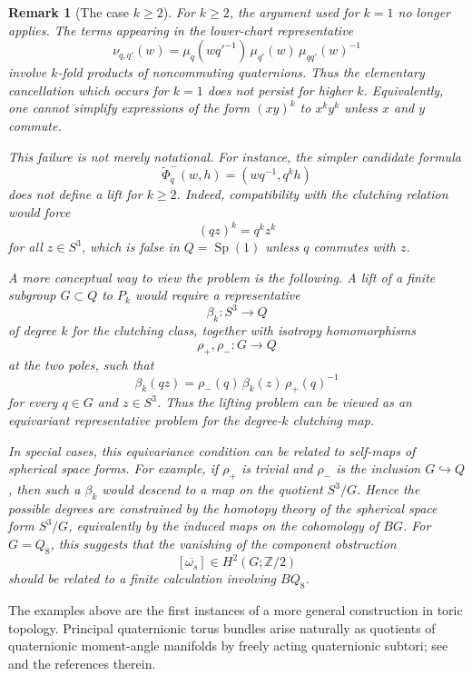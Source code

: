 \documentclass[11pt,a4paper]{article}
\numberwithin{equation}{section}
\newtheorem{remark}[definition]{Remark}
\theoremstyle{named}
\begin{document}
\begin{remark}[The case \(k\geq 2\)]
\label{rem:clutching-k2}
For \(k\geq 2\), the argument used for \(k=1\) no longer applies. The terms appearing in the lower-chart representative
\[
\nu_{q,q'}(w) =\mu_q(wq'^{-1})\,\mu_{q'}(w)\,\mu_{qq'}(w)^{-1}
\]
involve \(k\)-fold products of noncommuting quaternions. Thus the elementary cancellation which occurs for \(k=1\) does not persist for higher \(k\). Equivalently, one cannot simplify expressions of the form \((xy)^k\) to \(x^ky^k\) unless \(x\) and \(y\) commute.

This failure is not merely notational. For instance, the simpler candidate formula
\[
\widetilde\Phi_q^-(w,h)=(wq^{-1},q^k h)
\]
does not define a lift for \(k\geq 2\). Indeed, compatibility with the clutching relation would force
\[
(qz)^k=q^kz^k
\]
for all \(z\in S^3\), which is false in \(Q=\operatorname{Sp}(1)\) unless \(q\) commutes with \(z\).

A more conceptual way to view the problem is the following. A lift of a finite subgroup \(G\subset Q\) to \(P_k\) would require a representative
\[
\beta_k:S^3\longrightarrow Q
\]
of degree \(k\) for the clutching class, together with isotropy homomorphisms
\[
\rho_+,\rho_-:G\longrightarrow Q
\]
at the two poles, such that
\[
\beta_k(qz)=\rho_-(q)\,\beta_k(z)\,\rho_+(q)^{-1}
\]
for every \(q\in G\) and \(z\in S^3\). Thus the lifting problem can be viewed as an equivariant representative problem for the degree-\(k\) clutching map.

In special cases, this equivariance condition can be related to self-maps of spherical space forms. For example, if \(\rho_+\) is trivial and \(\rho_-\) is the inclusion \(G\hookrightarrow Q\), then such a \(\beta_k\) would descend to a map on the quotient \(S^3/G\). Hence the possible degrees are constrained by the homotopy theory of the spherical space form \(S^3/G\), equivalently by the induced maps on the cohomology of \(BG\). For \(G=Q_8\), this suggests that the vanishing of the component obstruction
\[
[\overline{\omega_s}]\in H^2(G;\mathbb Z/2)
\]
should be related to a finite calculation involving \(BQ_8\).
\end{remark}

The examples above are the first instances of a more general construction in toric topology. Principal quaternionic torus bundles arise naturally as quotients of quaternionic moment-angle manifolds by freely acting quaternionic subtori; see \cite{ho, gken} and the references therein.
\end{document}
